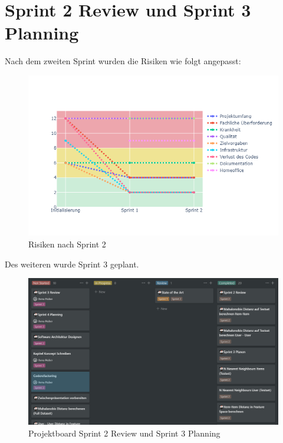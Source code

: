 \section*{Sprint 2 Review und Sprint 3 Planning}
Nach dem zweiten Sprint wurden die Risiken wie folgt angepasst:
\begin{figure}[htb]
	\centering
	\includegraphics[keepaspectratio,width=\linewidth]{img/Risiken per Sprint Sprint2.png}
	\caption{Risiken nach Sprint 2}
	\label{fig:Sprint 2 Risiken}
\end{figure}
Des weiteren wurde Sprint 3 geplant. 
\begin{figure}[htb]
	\centering
	\includegraphics[keepaspectratio,width=\linewidth]{img/Projektboard Sprint Review 2.png}
	\caption{Projektboard Sprint 2 Review und Sprint 3 Planning}
	\label{fig:Sprint 2 Review}
\end{figure}
